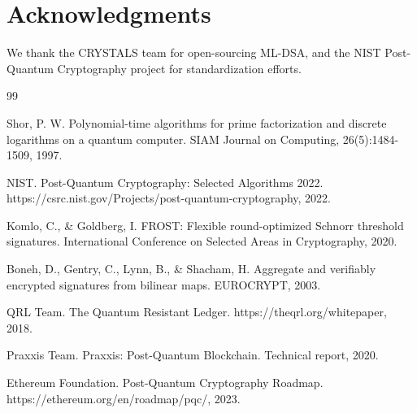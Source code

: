 \section*{Acknowledgments}


We thank the CRYSTALS team for open-sourcing ML-DSA, and the NIST Post-Quantum Cryptography project for standardization efforts.

\begin{thebibliography}{99}

Shor, P. W. Polynomial-time algorithms for prime factorization and discrete logarithms on a quantum computer. SIAM Journal on Computing, 26(5):1484-1509, 1997.

NIST. Post-Quantum Cryptography: Selected Algorithms 2022. https://csrc.nist.gov/Projects/post-quantum-cryptography, 2022.

Komlo, C., \& Goldberg, I. FROST: Flexible round-optimized Schnorr threshold signatures. International Conference on Selected Areas in Cryptography, 2020.

Boneh, D., Gentry, C., Lynn, B., \& Shacham, H. Aggregate and verifiably encrypted signatures from bilinear maps. EUROCRYPT, 2003.

QRL Team. The Quantum Resistant Ledger. https://theqrl.org/whitepaper, 2018.

Praxxis Team. Praxxis: Post-Quantum Blockchain. Technical report, 2020.

Ethereum Foundation. Post-Quantum Cryptography Roadmap. https://ethereum.org/en/roadmap/pqc/, 2023.

\end{thebibliography}

